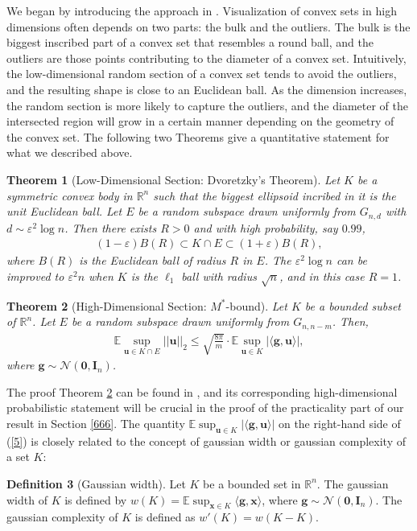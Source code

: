 \documentclass[11pt]{article}
\numberwithin{equation}{section}
\theoremstyle{plain}
\newtheorem{Th}{Theorem}[section]
\theoremstyle{definition}
\newtheorem{Def}[Th]{Definition}
\def\R{{\mathbb R}}
\def\E{{\mathbb E}}
\def\R{{\mathbb R}}
\def\x{{\mathbf x}}
\def\e{{\varepsilon}}
\def\g{{\mathbf{g}}}
\def\u{{\mathbf{u}}}
\begin{document}
We began by introducing the approach in \cite{vershynin2015estimation}.    Visualization of convex sets in high dimensions often depends on two parts: the bulk and the outliers. The bulk is the biggest inscribed part of a convex set that resembles a round ball, and the outliers are those points contributing to the diameter of a convex set. Intuitively, the low-dimensional random section of a convex set tends to avoid the outliers, and the resulting shape is close to an Euclidean ball. As the dimension increases, the random section is more likely to capture the outliers, and the diameter of the intersected region will grow in a certain manner depending on the geometry of the convex set. The following two Theorems give a quantitative statement for what we described above. 

\begin{Th}[Low-Dimensional Section: Dvoretzky's Theorem]\label{T1}
Let $K$ be a symmetric convex body in $\R^n$ such that the biggest ellipsoid incribed in it is the unit Euclidean ball. Let $E$ be a random subspace drawn uniformly from $G_{n,d}$ with $d\sim \e^2\log n$. Then there exists $R>0$ and with high probability, say $0.99$, 
\begin{align}
(1-\e)B(R)\subset K\cap E\subset (1+\e)B(R),
\end{align}
where $B(R)$ is the Euclidean ball of radius $R$ in $E$. The $\e^2\log n$ can be improved to $\e^2 n$ when $K$ is the $\ell_1$ ball with radius $\sqrt{n}$, and in this case $R=1$.   
\end{Th}

\begin{Th}[High-Dimensional Section: $M^*$-bound]\label{T2}
Let $K$ be a bounded subset of $\R^n$. Let $E$ be a random subspace drawn uniformly from $G_{n,n-m}$. Then, 
\begin{align}
\E\sup_{\u\in K\cap E}||\u||_2\leq \sqrt{\frac{8\pi}{m}}\cdot\E\sup_{\u\in K}|\langle \g,\u\rangle|,\label{5}
\end{align}
where $\g\sim\mathcal{N}(\mathbf{0},\mathbf{I}_n)$. 
\end{Th}
The proof Theorem \ref{T2} can be found in \cite{vershynin2018high}, and its corresponding high-dimensional probabilistic statement will be crucial in the proof of the practicality part of our result in Section \ref{666}. The quantity $\E\sup_{\u\in K}|\langle \g,\u\rangle|$ on the right-hand side of (\ref{5}) is closely related to the concept of gaussian width or gaussian complexity of a set $K$:
\begin{Def}[Gaussian width]
Let $K$ be a bounded set in $\R^n$. The gaussian width of $K$ is defined by $w(K)=\E\sup_{\x\in K}\langle\g, \x\rangle$, where $\g\sim\mathcal{N}(\mathbf{0},\mathbf{I}_n)$. The gaussian complexity of $K$ is defined as $w'(K)=w(K-K)$. 
\end{Def}
\end{document}
